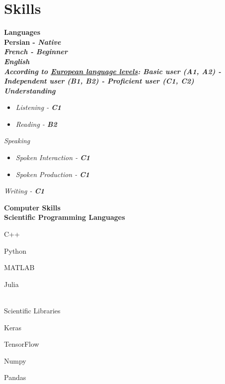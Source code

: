 \documentclass[10pt, a4paper]{article}
\newcommand{\sotagbox}[2][]{%
	\begin{tagbox}[#1]%
		#2
	\end{tagbox}%
}
\begin{document}
	\section*{Skills}
	
		\bfseries Languages \normalfont\\
		\indent\hspace{.2cm}Persian - \small\em\bfseries Native\normalfont\\
		\indent\hspace{.2cm}French - \small\em\bfseries Beginner\normalfont\\
		\indent\hspace{.2cm}English \\
		\indent\hspace{.4cm}\em According to \href{https://europass.cedefop.europa.eu/resources/european-language-levels-cefr}{European language levels}: Basic user (A1, A2) - Independent user (B1, B2) - Proficient user (C1, C2) \normalfont\\
		\indent\hspace{.4cm}\em Understanding
		\begin{itemize}
			\item \em Listening - \bfseries C1 \normalfont
			\item \em Reading - \bfseries B2 \normalfont
		\end{itemize}
		\indent\hspace{.4cm}\em Speaking
		\begin{itemize}
			\item \em Spoken Interaction - \bfseries C1 \normalfont
			\item \em Spoken Production - \bfseries C1 \normalfont
		\end{itemize}
		\indent\hspace{.4cm}\em Writing - \bfseries C1 \normalfont \\
		
		\pagebreak
		
		\bfseries Computer Skills \normalfont\\[.5cm]
		\indent\hspace{.4cm}Scientific Programming Languages \hspace{1cm}\sotagbox{C++}  \sotagbox{Python}  \sotagbox{MATLAB}  \sotagbox{Julia} \\
		
		\indent\hspace{.4cm}Scientific Libraries \hspace{3cm}\sotagbox{Keras}  \sotagbox{TensorFlow}  \sotagbox{Numpy}  \sotagbox{Pandas} \\
		
\end{document}
